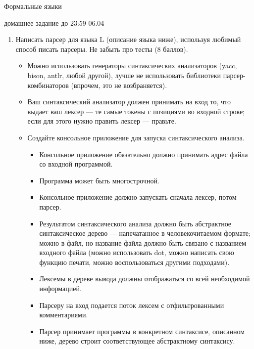 \documentclass{article}
\begin{document}
\begin{center} {\LARGE Формальные языки}

{\Large домашнее задание до 23:59 06.04}
\end{center}
\bigskip

\begin{enumerate}
  \item Написать парсер для языка L (описание языка ниже), используя любимый способ писать парсеры. Не забыть про тесты (8 баллов).
    \begin{itemize}
        \item Можно использовать генераторы синтаксических анализаторов (yacc, bison, antlr, любой другой), лучше не использовать библиотеки парсер-комбинаторов (впрочем, это не возбраняется). 
        \item Ваш синтаксический анализатор должен принимать на вход то, что выдает ваш лексер --- те самые токены с позициями во входной строке; если для этого нужно править лексер --- правьте.
        \item Создайте консольное приложение для запуска синтаксического анализа.
        \begin{itemize}
            \item Консольное приложение обязательно должно принимать адрес файла со входной программой.
            \item Программа может быть многострочной.
            \item Консольное приложение должно запускать сначала лексер, потом парсер.
            \item Результатом синтаксического анализа должно быть абстрактное синтаксическое дерево --- напечатанное в человекочитаемом формате; можно в файл, но название файла должно быть связано с названием входного файла (можно использовать dot, можно написать свою функцию печати, можно воспользоваться другими подходами).
            \item Лексемы в дереве вывода должны отображаться со всей необходимой информацией.
            \item Парсеру на вход подается поток лексем с отфильтрованными комментариями.
            \item Парсер принимает программы в конкретном синтаксисе, описанном ниже, дерево строит соответствующее абстрактному синтаксису.
        \end{itemize}
     \end{itemize}
\end{enumerate}
\end{document}
